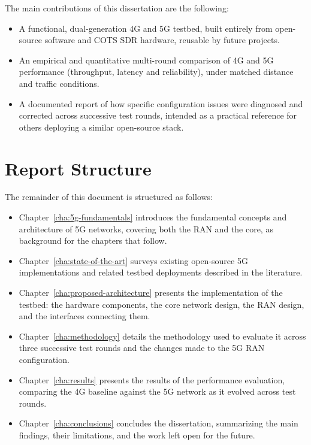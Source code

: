 The main contributions of this dissertation are the following:
\begin{itemize}
    \item A functional, dual-generation 4G and 5G testbed, built entirely from open-source software and \gls{COTS} \gls{SDR} hardware, reusable by future projects.
    \item An empirical and quantitative multi-round comparison of 4G and 5G performance  (throughput, latency and reliability), under matched distance and traffic conditions.
    \item A documented report of how specific configuration issues were diagnosed and corrected across successive test rounds, intended as a practical reference for others deploying a similar open-source stack.
\end{itemize}

\section{Report Structure}
\label{sec:report-structure}

The remainder of this document is structured as follows:

\begin{itemize}
    \item Chapter~\ref{cha:5g-fundamentals} introduces the fundamental concepts and architecture of 5G networks, covering both the \gls{RAN} and the core, as background for the chapters that follow.
    \item Chapter~\ref{cha:state-of-the-art} surveys existing open-source 5G implementations and related testbed deployments described in the literature.
    \item Chapter~\ref{cha:proposed-architecture} presents the implementation of the testbed: the hardware components, the core network design, the \gls{RAN} design, and the interfaces connecting them.
    \item Chapter~\ref{cha:methodology} details the methodology used to evaluate it across three successive test rounds and the changes made to the 5G \gls{RAN} configuration.
    \item Chapter~\ref{cha:results} presents the results of the performance evaluation, comparing the 4G baseline against the 5G network as it evolved across test rounds.
    \item Chapter~\ref{cha:conclusions} concludes the dissertation, summarizing the main findings, their limitations, and the work left open for the future.
\end{itemize}